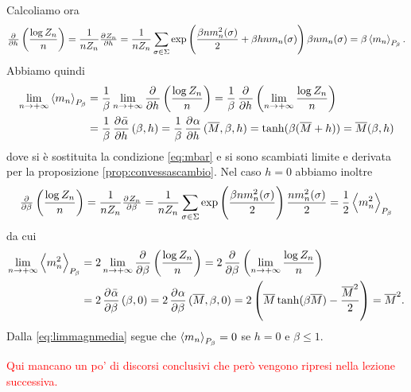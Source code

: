 Calcoliamo ora
\[ \pd{}{h}\left(\frac{\log Z_n}{n}\right) = \frac{1}{n Z_n} \pd{Z_n}{h} = \frac{1}{nZ_n}\sum_{\sigma \in \Sigma} \exp\left( \frac{\beta n m_n^2(\sigma)}{2} + \beta h n m_n(\sigma) \right) \beta n m_n(\sigma) = \beta \mean{m_n}_{P_\beta}. \]
Abbiamo quindi
\begin{align}
	\label{eq:limmagnmedia}
    \lim_{n \to +\infty}\mean{m_n}_{P_\beta} & = \frac{1}{\beta} \lim_{n \to +\infty} \dpd{}{h}\left(\frac{\log Z_n}{n}\right) = \frac{1}{\beta} \dpd{}{h} \left( \lim_{n \to +\infty} \frac{\log Z_n}{n} \right) \nonumber \\
	                                         & = \frac{1}{\beta} \dpd{\bar{\alpha}}{h}(\beta, h) = \frac{1}{\beta} \dpd{\alpha}{h} (\overline{M}, \beta, h) = \tanh(\beta(\overline{M}+h)) = \overline{M}(\beta, h)
\end{align}
dove si è sostituita la condizione \eqref{eq:mbar} e si sono scambiati limite e derivata per la proposizione \ref{prop:convessascambio}. Nel caso $ h = 0 $ abbiamo inoltre
\[ \pd{}{\beta} \left(\frac{\log Z_n}{n}\right) = \frac{1}{n Z_n} \pd{Z_n}{\beta} = \frac{1}{n Z_n} \sum_{\sigma \in \Sigma} \exp\left( \frac{\beta n m_n^2(\sigma)}{2} \right) \frac{n m_n^2(\sigma)}{2} = \frac{1}{2} \mean{m_n^2}_{P_\beta} \]
da cui
\begin{align*}
	\lim_{n \to +\infty}\mean{m_n^2}_{P_\beta} & = 2 \lim_{n \to +\infty} \dpd{}{\beta} \left(\frac{\log Z_n}{n}\right) = 2 \dpd{}{\beta} \left( \lim_{n \to +\infty}\frac{\log Z_n}{n} \right) \\
                                               & =	2 \dpd{\bar{\alpha}}{\beta}(\beta,0) = 2\dpd{\alpha}{\beta}(\overline{M},\beta,0) = 2\left( \overline{M}\tanh(\beta\overline{M}) - \frac{\overline{M}^2}{2} \right) = \overline{M}^2.
\end{align*}
Dalla \eqref{eq:limmagnmedia} segue che $ \left< m_n \right>_{P_\beta} = 0 $ se $ h = 0 $ e $ \beta \leq 1 $.

\textcolor{red}{Qui mancano un po' di discorsi conclusivi che però vengono ripresi nella lezione successiva.}
